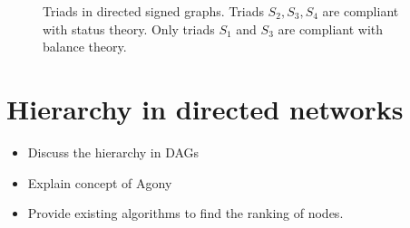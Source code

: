 \begin{figure}[!ht] 
    \centering
    
    \caption{Triads in directed signed graphs. Triads $S_2,S_3,S_4$ are compliant with status theory. Only triads $S_1$ and $S_3$ are compliant with balance theory.}
    \label{fig:status-triads}
\end{figure}
\section{Hierarchy in directed networks}
\label{sec:hierarchy}
\begin{itemize}
    \item Discuss the hierarchy in DAGs
    \item Explain concept of Agony
    \item Provide existing algorithms to find the ranking of nodes.
\end{itemize}